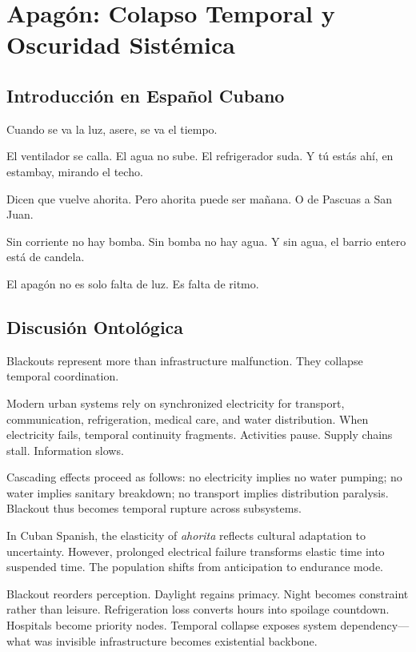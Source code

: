 \documentclass[12pt]{article}
\begin{document}
\section{Apagón: Colapso Temporal y Oscuridad Sistémica}

\subsection*{Introducción en Español Cubano}

Cuando se va la luz, asere, se va el tiempo.

El ventilador se calla. El agua no sube. El refrigerador suda. Y tú estás ahí, en estambay, mirando el techo.

Dicen que vuelve ahorita. Pero ahorita puede ser mañana. O de Pascuas a San Juan.

Sin corriente no hay bomba. Sin bomba no hay agua. Y sin agua, el barrio entero está de candela.

El apagón no es solo falta de luz. Es falta de ritmo.

\subsection*{Discusión Ontológica}

Blackouts represent more than infrastructure malfunction. They collapse temporal coordination.

Modern urban systems rely on synchronized electricity for transport, communication, refrigeration, medical care, and water distribution. When electricity fails, temporal continuity fragments. Activities pause. Supply chains stall. Information slows.

Cascading effects proceed as follows: no electricity implies no water pumping; no water implies sanitary breakdown; no transport implies distribution paralysis. Blackout thus becomes temporal rupture across subsystems.

In Cuban Spanish, the elasticity of \textit{ahorita} reflects cultural adaptation to uncertainty. However, prolonged electrical failure transforms elastic time into suspended time. The population shifts from anticipation to endurance mode.

Blackout reorders perception. Daylight regains primacy. Night becomes constraint rather than leisure. Refrigeration loss converts hours into spoilage countdown. Hospitals become priority nodes. Temporal collapse exposes system dependency---what was invisible infrastructure becomes existential backbone.
\end{document}
